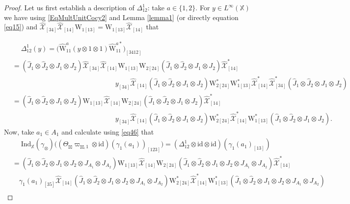 \documentclass[reqno]{amsart}
\numberwithin{equation}{section}
\newcommand{\id}{\mathrm{id}}
\newcommand{\X}{\mathbb{X}}
\newcommand{\Ind}{\mathrm{Ind}}
\newcommand{\mc}{\mathcal}
\newcommand{\wh}{\widehat}
\newcommand{\ww}{\mathrm{W}}
\begin{document}
\begin{proof}
Let us first establish a description of $\Delta_{12}^1$: take $a\in\{1,2\}$. For $y\in L^{\infty}(\X)$ we have using \eqref{EqMultUnitCocy2} and Lemma \ref{lemma1} (or directly equation \eqref{eq15}) and $\wh{\mc{X}}_{[34]} \wh{\mc{X}}_{[14]} \ww_{1[13]}=\ww_{1[13]}\wh{\mc{X}}_{[14]}$ that

\[\begin{split}
&\quad\;
\Delta_{12}^1(y)=
\bigl( \hat{\ww}_{11}^a (y\otimes 1\otimes 1) \hat{\ww}_{11}^{a *}\bigr)_{[3412]}\\
&=
(\hat{J}_1\otimes \hat{J}_2\otimes 
J_1\otimes J_2)
\wh{\mc{X}}_{[34]}\wh{\mc{X}}_{[14]}
\ww_{1[13]} \ww_{2[24]}
(\hat{J}_1\otimes \hat{J}_2\otimes 
J_1\otimes J_2)
\wh{\mc{X}}_{[14]}^*\\
&\quad\quad\quad\quad\quad
\quad\quad\quad\quad\quad
\quad\quad\quad\quad\quad y_{[34]}
\wh{\mc{X}}_{[14]}
(\hat{J}_1\otimes \hat{J}_2\otimes 
J_1\otimes J_2)
\ww_{2[24]}^*
\ww_{1[13]}^*
\wh{\mc{X}}_{[14]}^*\wh{\mc{X}}_{[34]}^*
(\hat{J}_1\otimes \hat{J}_2\otimes 
J_1\otimes J_2)\\
&=
(\hat{J}_1\otimes \hat{J}_2\otimes 
J_1\otimes J_2)
\ww_{1[13]}\wh{\mc{X}}_{[14]} \ww_{2[24]}
(\hat{J}_1\otimes \hat{J}_2\otimes 
J_1\otimes J_2)
\wh{\mc{X}}_{[14]}^*\\
&\quad\quad\quad\quad\quad
\quad\quad\quad\quad\quad
\quad\quad\quad\quad\quad y_{[34]}
\wh{\mc{X}}_{[14]}
(\hat{J}_1\otimes \hat{J}_2\otimes 
J_1\otimes J_2)
\ww_{2[24]}^*
\wh{\mc{X}}_{[14]}^*
\ww_{1[13]}^*
(\hat{J}_1\otimes \hat{J}_2\otimes 
J_1\otimes J_2).
\end{split}\]
Now, take $a_1\in A_1$ and calculate using \eqref{eq46} that
\begin{equation}\begin{split}\label{eq54}
&\quad\;
\Ind_{\X}(\gamma_\otimes )\bigl(
 (\Theta_{\boxtimes}\varpi_{\boxtimes,1}\otimes \id)(\gamma_1(a_1))_{[123]}
\bigr)=
(\Delta_{12}^1\otimes\id\otimes\id)(\gamma_1(a_1)_{[13]})\\
&=
(\hat{J}_1\otimes \hat{J}_2\otimes 
J_1\otimes J_2\otimes J_{A_1}\otimes J_{A_2})
\ww_{1[13]}\wh{\mc{X}}_{[14]} \ww_{2[24]}
(\hat{J}_1\otimes \hat{J}_2\otimes 
J_1\otimes J_2\otimes J_{A_1}\otimes J_{A_2})
\wh{\mc{X}}_{[14]}^*\\
&\quad
\gamma_1(a_1)_{[35]}
\wh{\mc{X}}_{[14]}
(\hat{J}_1\otimes \hat{J}_2\otimes 
J_1\otimes J_2\otimes J_{A_1}\otimes J_{A_2})
\ww_{2[24]}^*
\wh{\mc{X}}_{[14]}^*
\ww_{1[13]}^*
(\hat{J}_1\otimes \hat{J}_2\otimes 
J_1\otimes J_2\otimes J_{A_1}\otimes J_{A_2})\\

\end{split}
\end{equation}
\end{proof}
\end{document}
